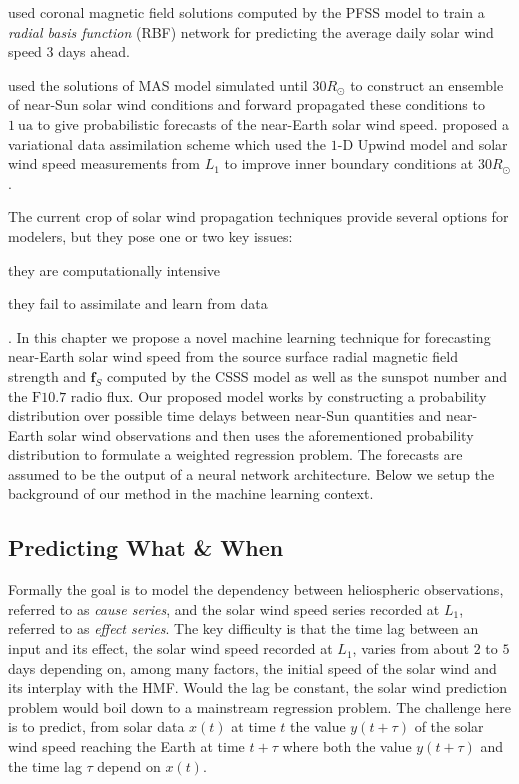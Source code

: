 \citet{wintoft1997prediction} used coronal magnetic field solutions computed by the PFSS model 
to train a \emph{radial basis function} (RBF) network for predicting the average daily solar wind 
speed $3$ days ahead.  

\citet{Owens2017} used the solutions of MAS model simulated until $30R_{\odot}$ to construct an 
ensemble of near-Sun solar wind conditions and forward propagated these conditions to 
$\SI{1}{\astronomicalunit}$ to give probabilistic forecasts of the near-Earth solar wind speed. 
\citet{Owens2019} proposed a variational data assimilation scheme which used the 
$1\textrm{-}\text{D}$ Upwind model and solar wind speed measurements from $L_1$ to improve inner 
boundary conditions at $30R_{\odot}$.

The current crop of solar wind propagation techniques provide several options for 
modelers, but they pose one or two key issues: 
%
\begin{enumerate*} 
  \item they are computationally intensive 
  \item they fail to assimilate and learn from data 
\end{enumerate*}. 
%
In this chapter we propose a novel machine learning technique for forecasting near-Earth solar wind 
speed from the source surface radial magnetic field strength and $\mathbf{f}_S$ computed by the 
CSSS model as well as the sunspot number and the $\mathrm{F}10.7$ radio flux. Our proposed model 
works by constructing a probability distribution over possible time delays between near-Sun 
quantities and near-Earth solar wind observations and then uses the aforementioned probability 
distribution to formulate a weighted regression problem. The forecasts are assumed to be the output 
of a neural network architecture. Below we setup the background of our method in the machine 
learning context.

\subsection{Predicting What \& When}\label{sec:dtlrintro}
Formally the goal is to model the dependency between heliospheric observations, referred to as 
{\em cause series}, and the solar wind speed series recorded at $L_1$, referred to as 
{\em effect series}. The key difficulty is that the time lag between an input and its effect, the 
solar wind speed recorded at $L_1$, varies from about $2$ to $5$ days depending on, among many 
factors, the initial speed of the solar wind and its interplay with the HMF. Would the lag be 
constant, the solar wind prediction problem would boil down to a mainstream regression problem. The 
challenge here is to predict, from solar data $x(t)$ at time $t$ the value $y(t+\tau)$ of the solar 
wind speed reaching the Earth at time $t+\tau$ where both the value $y(t+\tau)$ and the time lag 
$\tau$ depend on $x(t)$.

